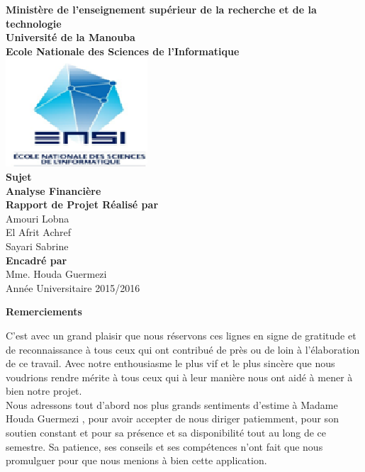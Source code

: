 \documentclass[a4paper,10pt]{article}
\begin{document}
\begin{center}

\large
\textbf{Ministère de l'enseignement supérieur de la recherche et de la technologie}\\

\textbf{Université de la Manouba}\\

\textbf{Ecole Nationale des Sciences de l’Informatique}\\

\includegraphics[scale=0.75]{logo.png}\\

\large
\textbf{Sujet}\\

\textbf{Analyse Financière}\\

\textbf{Rapport de Projet Réalisé par} \\  

\normalsize                       
Amouri Lobna\\
El Afrit Achref\\
Sayari Sabrine\\
\large
\textbf{Encadré par}\\

Mme. Houda Guermezi\\

\normalsize
Année Universitaire 2015/2016\\
\end{center}
\newpage
\Huge
\textbf{Remerciements}\\

\normalsize

C'est  avec un grand  plaisir  que nous réservons  ces lignes en signe de gratitude  et de reconnaissance à tous ceux qui ont contribué
de près ou de loin à l'élaboration de ce travail. Avec notre enthousiasme le plus vif et le plus sincère que nous voudrions rendre mérite
à tous ceux qui à  leur manière nous ont aidé  à mener à bien notre projet.\\

Nous adressons tout d'abord nos plus grands sentiments d'estime à Madame Houda Guermezi , pour avoir accepter de nous diriger patiemment,
pour son soutien constant et pour sa présence et sa disponibilité tout au long de ce semestre. Sa patience, ses conseils et ses compétences
n'ont fait que nous promulguer pour que nous menions à bien cette application.\\
\end{document}
